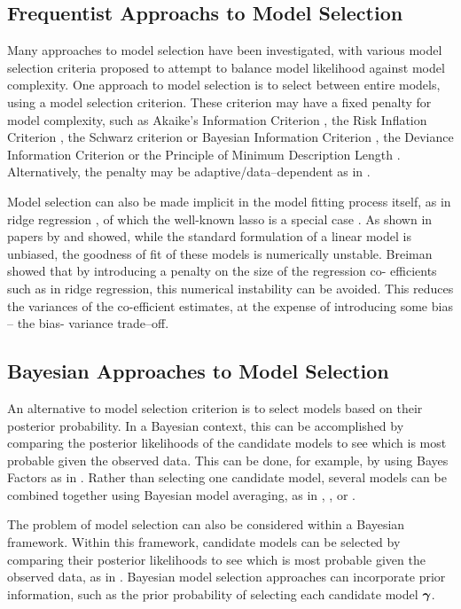 \subsection{Frequentist Approachs to Model Selection}
Many approaches to model selection have been investigated, with various model selection criteria proposed to
attempt to balance model likelihood against model complexity. One approach to model selection is to select
between entire models, using a model selection criterion. These criterion may have a fixed penalty for model
complexity, such as Akaike's Information Criterion \citep{Akaike1974}, the Risk Inflation Criterion
\citep{Foster1994}, the Schwarz criterion or Bayesian Information Criterion \citep{Schwarz1978}, the Deviance
Information Criterion \citep{Spiegelhalter2016} or the Principle of Minimum Description Length
\citep{Hansen2001}. Alternatively, the penalty may be adaptive/data--dependent as in \citep{George2000}.

Model selection can also be made implicit in the model fitting process itself, as in ridge regression
\citep{Casella1980}, of which the well-known lasso is a special case \citep{Tibshirani1996}. As shown in
papers by \citep{Breiman1996} and \citep{Efron2013} showed, while  the standard formulation of a linear model
is unbiased, the goodness of fit of these models is numerically  unstable. Breiman showed that by introducing
a penalty on the size of the regression co- efficients such as  in ridge regression, this numerical
instability can be avoided. This reduces the variances of the co-efficient estimates, at the expense of
introducing some bias -- the bias- variance trade--off.

\subsection{Bayesian Approaches to Model Selection}
An alternative to model selection criterion is to select models based on their posterior probability. In a
Bayesian context, this can be accomplished by comparing the posterior likelihoods of the candidate models to
see which is most probable given the observed data. This can be done, for example, by using Bayes Factors as
in \citep{Kass1993}. Rather than selecting one candidate model, several models can be combined together using
Bayesian model averaging, as in \citep{Hoeting1999}, \citep{Raftery1997}, \citep{Fernandez2001} or
\citep{Papaspiliopoulos2016}.

The problem of model selection can also be considered within a Bayesian framework.
Within this framework, candidate models can be selected by comparing their posterior likelihoods to see
which is most probable given the observed data, as in \citep{Kass1993}. Bayesian model selection approaches
can incorporate prior information, such as the prior probability of selecting each candidate model ${\boldsymbol \gamma}$.

